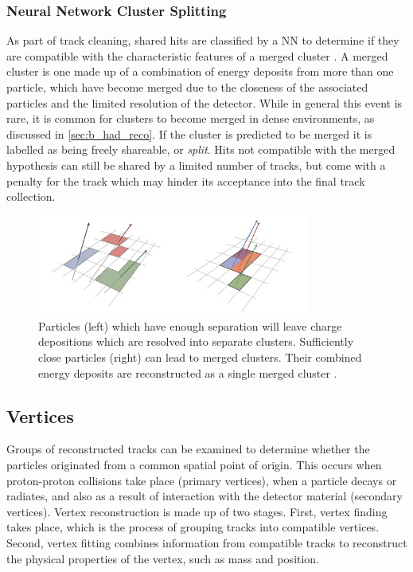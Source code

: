 \subsubsection{Neural Network Cluster Splitting}
As part of track cleaning, shared hits are classified by a NN to determine if they are compatible with the characteristic features of a merged cluster \cite{PERF-2012-05, ATL-PHYS-PUB-2015-006}.
A merged cluster is one made up of a combination of energy deposits from more than one particle, which have become merged due to the closeness of the associated particles and the limited resolution of the detector.
While in general this event is rare, it is common for clusters to become merged in dense environments, as discussed in \cref{sec:b_had_reco}.
If the cluster is predicted to be merged it is labelled as being freely shareable, or \textit{split}.
Hits not compatible with the merged hypothesis can still be shared by a limited number of tracks, but come with a penalty for the track which may hinder its acceptance into the final track collection.
%
\begin{figure}[ht]
    \centering
    \includegraphics[width=0.8\textwidth]{chapters/2.detector/figs/merged-cluster.png}
    \caption{
      Particles (left) which have enough separation will leave charge depositions which are resolved into separate clusters.
      Sufficiently close particles (right) can lead to merged clusters.
      Their combined energy deposits are reconstructed as a single merged cluster \cite{PERF-2015-08}.}
    \label{fig:resolved/merged clusters}
\end{figure}
%


\subsection{Vertices}\label{sec:vertex_reco}
Groups of reconstructed tracks can be examined to determine whether the particles originated from a common spatial point of origin.
This occurs when proton-proton collisions take place (primary vertices), when a particle decays or radiates, and also as a result of interaction with the detector material (secondary vertices).
Vertex reconstruction is made up of two stages.
First, vertex finding takes place, which is the process of grouping tracks into compatible vertices.
Second, vertex fitting combines information from compatible tracks to reconstruct the physical properties of the vertex, such as mass and position.

